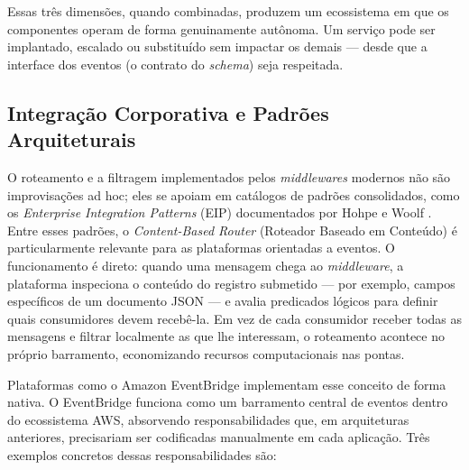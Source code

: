 \documentclass[12pt, a4paper]{article}
\begin{document}
Essas três dimensões, quando combinadas, produzem um ecossistema em que os componentes operam de forma genuinamente autônoma. Um serviço pode ser implantado, escalado ou substituído sem impactar os demais --- desde que a interface dos eventos (o contrato do \textit{schema}) seja respeitada.


\subsection{Integração Corporativa e Padrões Arquiteturais}

O roteamento e a filtragem implementados pelos \textit{middlewares} modernos não são improvisações ad hoc; eles se apoiam em catálogos de padrões consolidados, como os \textit{Enterprise Integration Patterns} (EIP) documentados por Hohpe e Woolf \cite{hohpe2003}. Entre esses padrões, o \textit{Content-Based Router} (Roteador Baseado em Conteúdo) é particularmente relevante para as plataformas orientadas a eventos. O funcionamento é direto: quando uma mensagem chega ao \textit{middleware}, a plataforma inspeciona o conteúdo do registro submetido --- por exemplo, campos específicos de um documento JSON --- e avalia predicados lógicos para definir quais consumidores devem recebê-la. Em vez de cada consumidor receber todas as mensagens e filtrar localmente as que lhe interessam, o roteamento acontece no próprio barramento, economizando recursos computacionais nas pontas.

Plataformas como o Amazon EventBridge implementam esse conceito de forma nativa. O EventBridge funciona como um barramento central de eventos dentro do ecossistema AWS, absorvendo responsabilidades que, em arquiteturas anteriores, precisariam ser codificadas manualmente em cada aplicação. Três exemplos concretos dessas responsabilidades são:
\end{document}
